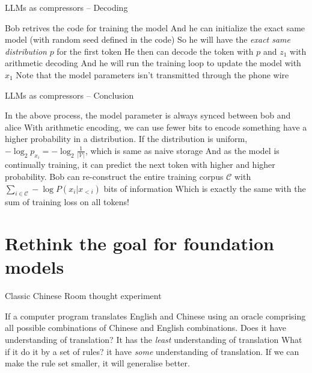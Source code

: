 \documentclass[scheme=plain]{ctexbeamer}
\begin{document}
\begin{frame}{LLMs as compressors -- Decoding}
  \begin{outline}
    \1 Bob retrives the code for training the model
    \pause
    \1 And he can initialize the exact same model (with random seed defined in the code)
    \pause
    \1 So he will have the \emph{exact same distribution} $p$ for the first token
      \2 He then can decode the token with $p$ and $z_1$ with arithmetic decoding
      \pause
    \1 And he will run the training loop to update the model with $x_1$
    \1 Note that the model parameters isn't transmitted through the phone wire
  \end{outline}
\end{frame}

\begin{frame}{LLMs as compressors -- Conclusion}
  \begin{outline}
    \1 In the above process, the model parameter is always synced between bob and alice
    \1 With arithmetic encoding, we can use fewer bits to encode something have a higher probability in a distribution.
      \2 If the distribution is uniform, $-\log_2 p_{x_i} = -\log_2 \frac{1}{|\mathcal{V}|}$, which is same as naive storage
      \2 And as the model is continually training, it can predict the next token with higher and higher probability.
    \1 Bob can re-construct the entire training corpus $\mathcal{C}$ with $\sum_{i \in \mathcal{C}} - \log P(x_i | x_{<i}) $ bits of information
      \2 Which is exactly the same with the sum of training loss on all tokens!
  \end{outline}
\end{frame}

\section[LLM, compression and AGI]{Rethink the goal for foundation models}

\begin{frame}{Classic Chinese Room thought experiment}
  \begin{outline}
    \1 If a computer program translates English and Chinese using an oracle comprising all possible combinations of Chinese and English combinations.
      \2 Does it have understanding of translation?
    \pause
      \2 It has the \emph{least} understanding of translation
    \1 What if it do it by a set of rules?
      \2 it have \emph{some} understanding of translation.
    \pause
    \1 If we can make the rule set smaller, it will generalise better.
  \end{outline}
\end{frame}
\end{document}
